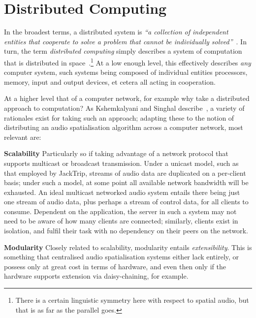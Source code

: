 \section{Distributed Computing}\label{sec:distributed-computing}

In the broadest terms, a distributed system is \textit{``a collection of
independent entities that cooperate to solve a problem that cannot be
individually solved''}~\citep{kshemkalyani_distributed_2011}.
In turn, the term \textit{distributed computing} simply describes a system of
computation that is distributed in
space~\citep{lamport_distributed_1990}.\footnote{
    There is a certain linguistic symmetry here with respect to spatial audio,
    but that is as far as the parallel goes.
}
At a low enough level, this effectively describes \textit{any} computer
system, such systems being composed of individual entities \textemdash{}
processors, memory, input and output devices, et cetera \textemdash{} all
acting in cooperation.

At a higher level \textemdash{} that of a computer network, for example
\textemdash{} why take a distributed approach to computation?
As Kshemkalyani and Singhal describe~\citep{kshemkalyani_distributed_2011},
a variety of rationales exist for taking such an approach;
adapting these to the notion of distributing an audio spatialisation algorithm
across a computer network, most relevant are:

\textbf{Scalability}
Particularly so if taking advantage of a network protocol that supports
multicast or broadcast transmission.
Under a unicast model, such as that employed by JackTrip, streams of audio data
are duplicated on a per-client basis;
under such a model, at some point all available network bandwidth will be
exhausted.
An ideal multicast networked audio system entails there being just one stream
of audio data, plus perhaps a stream of control data, for all clients to
consume.
Dependent on the application, the server in such a system may not need to be
aware of how many clients are connected; similarly, clients exist in isolation,
and fulfil their task with no dependency on their peers on the network.

\textbf{Modularity}
Closely related to scalability, modularity entails \textit{extensibility}.
This is something that centralised audio spatialisation systems either lack
entirely, or possess only at great cost in terms of hardware, and even then only
if the hardware supports extension via daisy-chaining, for example.

